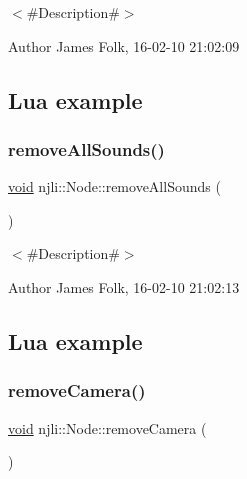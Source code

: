 $<$\#\+Description\#$>$ 

\begin{DoxyAuthor}{Author}
James Folk, 16-\/02-\/10 21\+:02\+:09
\end{DoxyAuthor}
\hypertarget{classnjli_1_1_steering_behavior_wander_ex1}{}\subsection{Lua example}\label{classnjli_1_1_steering_behavior_wander_ex1}

\begin{DoxyCodeInclude}
\end{DoxyCodeInclude}
\mbox{\label{classnjli_1_1_node_a8b1a04170a07e378a7972dcc8f7671ea}} 
\subsubsection{\texorpdfstring{remove\+All\+Sounds()}{removeAllSounds()}}
{\footnotesize\ttfamily \mbox{\hyperlink{_thread_8h_af1e856da2e658414cb2456cb6f7ebc66}{void}} njli\+::\+Node\+::remove\+All\+Sounds (\begin{DoxyParamCaption}{ }\end{DoxyParamCaption})}



$<$\#\+Description\#$>$ 

\begin{DoxyAuthor}{Author}
James Folk, 16-\/02-\/10 21\+:02\+:13
\end{DoxyAuthor}
\hypertarget{classnjli_1_1_steering_behavior_wander_ex1}{}\subsection{Lua example}\label{classnjli_1_1_steering_behavior_wander_ex1}

\begin{DoxyCodeInclude}
\end{DoxyCodeInclude}
\mbox{\label{classnjli_1_1_node_a48c8ac87c02260fe2cc64db3bb7f208b}} 
\subsubsection{\texorpdfstring{remove\+Camera()}{removeCamera()}}
{\footnotesize\ttfamily \mbox{\hyperlink{_thread_8h_af1e856da2e658414cb2456cb6f7ebc66}{void}} njli\+::\+Node\+::remove\+Camera (\begin{DoxyParamCaption}{ }\end{DoxyParamCaption})}



